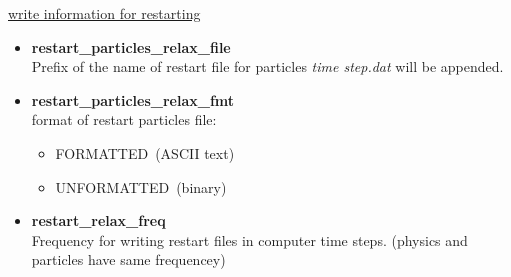 \documentclass[a4paper,10pt]{article}
\begin{document}
\begin{center}
\underline{\textlangle write information for restarting \textrangle}
\end{center}

\begin{itemize}
 \item \textbf{restart\_particles\_relax\_file} \\
Prefix of the name of restart file for particles 
\textit{time step.dat} will be appended.

\item \textbf{restart\_particles\_relax\_fmt} \\
format of restart particles file:
\begin{itemize}
 \item 
FORMATTED~(ASCII text)
\item
UNFORMATTED~(binary)
\end{itemize}

\item \textbf{restart\_relax\_freq} \\
Frequency for writing restart files
in computer time steps.
(physics and particles have same frequencey)

\end{itemize}
\end{document}
